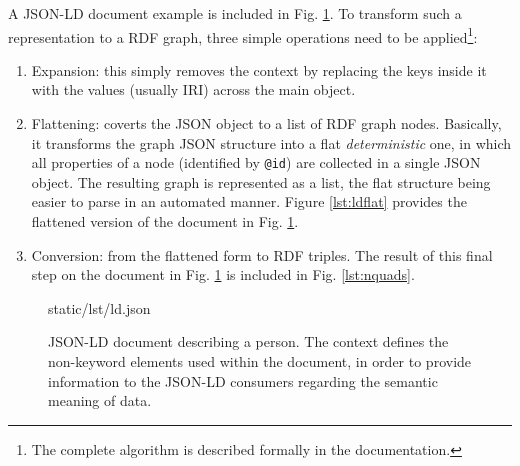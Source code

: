 A JSON-LD document example is included in Fig. \ref{lst:jsonld}. To transform
such a representation to a RDF graph, three simple operations need to be
applied\footnote{The complete algorithm is described formally in the
documentation.}:
\begin{enumerate}
  \item Expansion: this simply removes the context by replacing the keys inside
                   it with the values (usually IRI) across the main object.
  \item Flattening: coverts the JSON object to a list of RDF graph nodes.
                    Basically, it transforms the graph JSON structure into a
                    flat \textit{deterministic} one, in which all properties of
                    a node (identified by \texttt{@id}) are collected in a
                    single JSON object. The resulting graph is represented as
                    a list, the flat structure being easier to parse in an
                    automated manner. Figure \ref{lst:ldflat} provides the
                    flattened version of the document in Fig. \ref{lst:jsonld}.
  \item Conversion: from the flattened form to RDF triples. The result of this
                    final step on the document in Fig. \ref{lst:jsonld} is
                    included in Fig. \ref{lst:nquads}.
\end{enumerate}

\begin{figure}[!ht]
  
    {static/lst/ld.json}
    \caption[JSON-LD document describing a person]
            {JSON-LD document describing a person. The context defines the
             non-keyword elements used within the document, in order to provide
             information to the JSON-LD consumers regarding the semantic
             meaning of data.}
    \label{lst:jsonld}
\end{figure}

